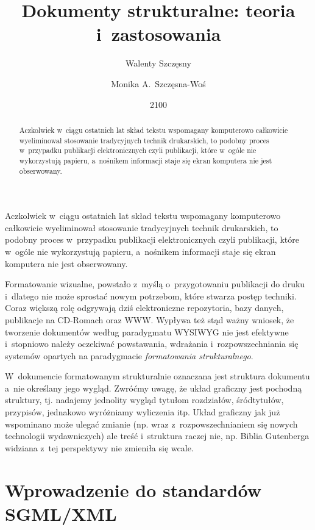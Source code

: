 \documentclass[skorowidz,brudnopis,xodstep]{xmgr}
\author   {Walenty Szczęsny}
\author   {Monika A.~Szczęsna-Woś}
\title    {Dokumenty strukturalne: teoria i~zastosowania}
\date     {2100}
\begin{document}
\begin{abstract}
  Aczkolwiek w~ciągu ostatnich lat skład tekstu wspomagany komputerowo
  całkowicie wyeliminował stosowanie tradycyjnych technik drukarskich,
  to podobny proces w~przypadku publikacji elektronicznych czyli
  publikacji, które w~ogóle nie wykorzystują papieru, a~nośnikem
  informacji staje się ekran komputera nie jest obserwowany.
\end{abstract}

\maketitle
%
\introduction

Aczkolwiek w~ciągu ostatnich lat skład tekstu wspomagany
komputerowo całkowicie wyeliminował stosowanie tradycyjnych technik
drukarskich, to podobny proces w~przypadku publikacji elektronicznych
czyli publikacji, które w~ogóle nie wykorzystują papieru, a~nośnikem
informacji staje się ekran komputera nie jest obserwowany.

Formatowanie wizualne, powstało z~myślą o~przygotowaniu publikacji do
druku i~dlatego nie może sprostać nowym potrzebom, które stwarza
postęp techniki. Coraz większą rolę odgrywają dziś elektroniczne
repozytoria, bazy danych, publikacje na CD-Romach oraz WWW.  Wypływa
też stąd ważny wniosek, że tworzenie dokumentów według paradygmatu
WYSIWYG nie jest efektywne i~stopniowo należy oczekiwać powstawania,
wdrażania i~rozpowszechniania się systemów opartych na paradygmacie
\emph{formatowania strukturalnego}.

W~dokumencie formatowanym strukturalnie oznaczana jest struktura
dokumentu a~nie określany jego wygląd. Zwróćmy uwagę, że układ
graficzny jest pochodną struktury, tj. nadajemy jednolity wygląd
tytułom rozdziałów, śródtytułów, przypisów, jednakowo wyróżniamy
wyliczenia itp.  Układ graficzny jak już wspominano może ulegać zmianie
(np. wraz z~rozpowszechnianiem się nowych technologii wydawniczych)
ale treść i~struktura raczej nie, np. Biblia Gutenberga widziana z~tej
perspektywy nie zmieniła się wcale.

\chapter{Wprowadzenie do standardów SGML/XML}
\end{document}
